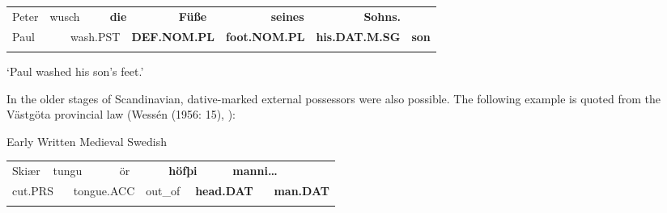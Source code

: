 \begin{tabular}{llllllllllll}
\lsptoprule
Peter & \multicolumn{2}{l}{wusch

} & \multicolumn{2}{l}{{\bfseries die}

} & \multicolumn{2}{l}{{\bfseries Füße}

} & \multicolumn{2}{l}{{\bfseries seines}

} & \multicolumn{2}{l}{{\bfseries Sohns.}

} & \\
\multicolumn{2}{l}{Paul

} & \multicolumn{2}{l}{wash.PST

} & \multicolumn{2}{l}{{\bfseries DEF.NOM.PL}

} & \multicolumn{2}{l}{{\bfseries foot.NOM.PL}

} & \multicolumn{2}{l}{{\bfseries his.DAT.M.SG}

} & \multicolumn{2}{l}{{\bfseries son}

}\\
\lspbottomrule
\end{tabular}

\begin{styleTranslation}
‘Paul washed his son’s feet.’

\end{styleTranslation}

\begin{styleBodyTextFirst}
In the older stages of Scandinavian, dative-marked external possessors were also possible. The following example is quoted from the Västgöta provincial law (Wessén (1956: 15), \citet[212]{Norde1997}): 

\end{styleBodyTextFirst}


\begin{listWWNumileveli}
\item 

\begin{styleExample}
Early Written Medieval Swedish

\end{styleExample}

\end{listWWNumileveli}

\begin{tabular}{llllllllll}
\lsptoprule
Skiær & \multicolumn{2}{l}{tungu

} & \multicolumn{2}{l}{ör

} & \multicolumn{2}{l}{{\bfseries höfþi}

} & \multicolumn{2}{l}{{\bfseries manni…}

} & \\
\multicolumn{2}{l}{cut.PRS

} & \multicolumn{2}{l}{tongue.ACC

} & \multicolumn{2}{l}{out\_of

} & \multicolumn{2}{l}{{\bfseries head.DAT}

} & \multicolumn{2}{l}{{\bfseries man.DAT}

}\\
\lspbottomrule
\end{tabular}

